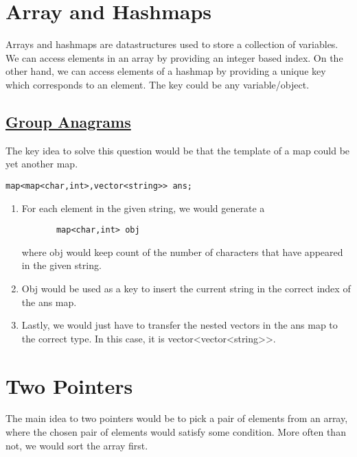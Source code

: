 \documentclass[11pt]{article}
\begin{document}
\tableofcontents
\section{Array and Hashmaps}
Arrays and hashmaps are datastructures used to store a collection of variables.
We can access elements in an array by providing an integer based index. On the other hand, we can access elements of a hashmap by providing a unique key which corresponds to an element. The key could be any variable/object.
\subsection{
 \href{https://leetcode.com/problems/group-anagrams/submissions/}{Group Anagrams}
}
The key  idea to solve this question would be that the template of a map could be yet another map.

\begin {lstlisting}
map<map<char,int>,vector<string>> ans;
\end{lstlisting}
\begin{enumerate}
 \item {
       
       For each element in the given string, we would generate a
       \begin {lstlisting}
       map<char,int> obj
       \end{lstlisting}
       where obj would keep count of the number of characters that have appeared in the given string.
       }
       
       \item{
                   Obj would be used as a key to insert the current string in the correct index of the ans map.
             }
 \item {
       Lastly, we would just have to transfer the nested vectors in the ans map to the correct type.
       In this case, it is vector<vector<string>>.
       }
\end{enumerate}

\section{Two Pointers}
The main idea to two pointers would be to pick a pair of elements from an array, where the chosen pair of elements would satisfy some condition. More often than not, we would sort the array first.
\end{document}
